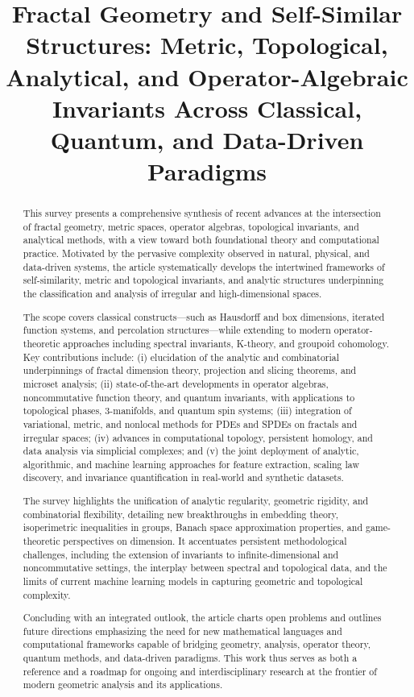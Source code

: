 \documentclass[sigconf]{acmart}
\title{Fractal Geometry and Self-Similar Structures: Metric, Topological, Analytical, and Operator-Algebraic Invariants Across Classical, Quantum, and Data-Driven Paradigms}
\begin{document}
\begin{abstract}
This survey presents a comprehensive synthesis of recent advances at the intersection of fractal geometry, metric spaces, operator algebras, topological invariants, and analytical methods, with a view toward both foundational theory and computational practice. Motivated by the pervasive complexity observed in natural, physical, and data-driven systems, the article systematically develops the intertwined frameworks of self-similarity, metric and topological invariants, and analytic structures underpinning the classification and analysis of irregular and high-dimensional spaces. 

The scope covers classical constructs—such as Hausdorff and box dimensions, iterated function systems, and percolation structures—while extending to modern operator-theoretic approaches including spectral invariants, K-theory, and groupoid cohomology. Key contributions include: (i) elucidation of the analytic and combinatorial underpinnings of fractal dimension theory, projection and slicing theorems, and microset analysis; (ii) state-of-the-art developments in operator algebras, noncommutative function theory, and quantum invariants, with applications to topological phases, 3-manifolds, and quantum spin systems; (iii) integration of variational, metric, and nonlocal methods for PDEs and SPDEs on fractals and irregular spaces; (iv) advances in computational topology, persistent homology, and data analysis via simplicial complexes; and (v) the joint deployment of analytic, algorithmic, and machine learning approaches for feature extraction, scaling law discovery, and invariance quantification in real-world and synthetic datasets.

The survey highlights the unification of analytic regularity, geometric rigidity, and combinatorial flexibility, detailing new breakthroughs in embedding theory, isoperimetric inequalities in groups, Banach space approximation properties, and game-theoretic perspectives on dimension. It accentuates persistent methodological challenges, including the extension of invariants to infinite-dimensional and noncommutative settings, the interplay between spectral and topological data, and the limits of current machine learning models in capturing geometric and topological complexity.

Concluding with an integrated outlook, the article charts open problems and outlines future directions emphasizing the need for new mathematical languages and computational frameworks capable of bridging geometry, analysis, operator theory, quantum methods, and data-driven paradigms. This work thus serves as both a reference and a roadmap for ongoing and interdisciplinary research at the frontier of modern geometric analysis and its applications.
\end{abstract}
\end{document}
